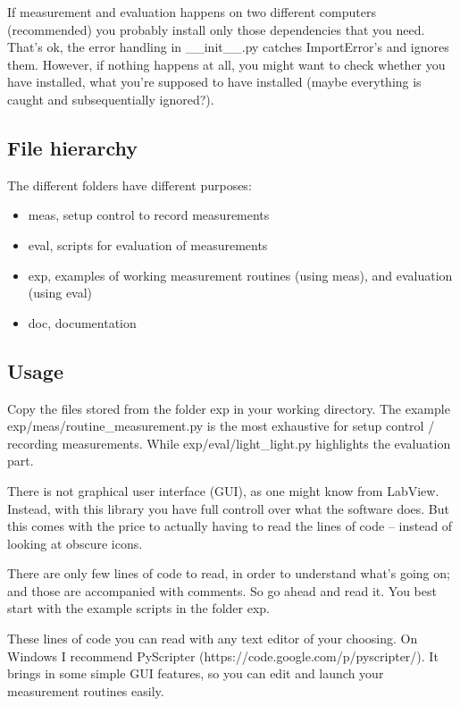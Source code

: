 If measurement and evaluation happens on two different computers (recommended)
you probably install only those dependencies that you need.
That's ok, the error handling in \_\_init\_\_.py catches ImportError's and ignores them.
However, if nothing happens at all,
you might want to check whether you have installed,
what you're supposed to have installed
(maybe everything is caught and subsequentially ignored?).

\subsection{File hierarchy}

The different folders have different purposes:
\begin{itemize}
  \item meas, setup control to record measurements
  \item eval, scripts for evaluation of measurements
  \item exp, examples of working measurement routines (using meas), and evaluation (using eval)
  \item doc, documentation
\end{itemize}

\subsection{Usage}

Copy the files stored from the folder exp in your working directory.
The example exp/meas/routine\_measurement.py is the most exhaustive for setup control / recording measurements.
While exp/eval/light\_light.py highlights the evaluation part.

There is not graphical user interface (GUI),
as one might know from LabView.
Instead, with this library
you have full controll over
what the software does.
But this comes with the price
to actually having to read the lines of code --
instead of looking at obscure icons.

There are only few lines of code
to read,
in order to understand what's going on;
and those are accompanied with comments.
So go ahead and read it.
You best start with the example scripts in the folder exp.

These lines of code
you can read with any text editor
of your choosing.
On Windows I recommend PyScripter (https://code.google.com/p/pyscripter/).
It brings in some simple GUI features,
so you can edit and launch your measurement routines easily.
